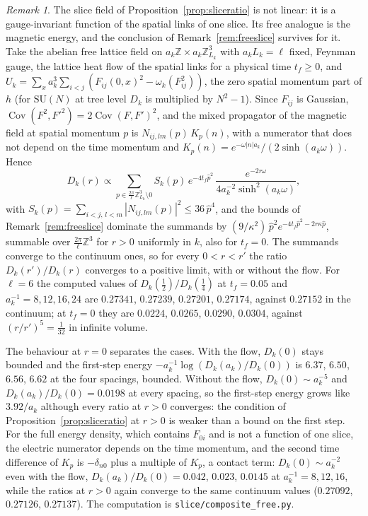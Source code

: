 \documentclass[11pt]{amsart}
\theoremstyle{definition}
\theoremstyle{remark}
\newtheorem{remark}[theorem]{Remark}
\numberwithin{equation}{section}
\newcommand{\Z}{\mathbb{Z}}
\newcommand{\SU}{\mathrm{SU}}
\begin{document}
\begin{remark}\label{rem:compositeslice}
The slice field of Proposition~\ref{prop:sliceratio} is not linear: it is a
gauge-invariant function of the spatial links of one slice. Its free analogue
is the magnetic energy, and the conclusion of Remark~\ref{rem:freeslice}
survives for it. Take the abelian free lattice field on $a_k\Z\times
a_k\Z^3_{L_k}$ with $a_kL_k=\ell$ fixed, Feynman gauge, the lattice heat flow
of the spatial links for a physical time $t_f\ge0$, and
$U_k=\sum_x a_k^3\sum_{i<j}(F_{ij}(0,x)^2-\omega_k(F_{ij}^2))$, the zero
spatial momentum part of $h$ (for $\SU(N)$ at tree level $D_k$ is multiplied by
$N^2-1$). Since $F_{ij}$ is Gaussian, $\operatorname{Cov}(F^2,F'^2)=2\operatorname{Cov}(F,F')^2$,
and the mixed propagator of the magnetic field at spatial momentum $p$ is
$N_{ij,lm}(p)\,K_p(n)$, with a numerator that does not depend on the time
momentum and $K_p(n)=e^{-\omega|n|a_k}/(2\sinh(a_k\omega))$. Hence
\[
D_k(r)\propto\sum_{p\in\frac{2\pi}\ell\Z^3_{L_k}\setminus0}
S_k(p)\,e^{-4t_f\hat p^2}\,\frac{e^{-2r\omega}}{4a_k^{-2}\sinh^2(a_k\omega)},
\]
with $S_k(p)=\sum_{i<j,\,l<m}|N_{ij,lm}(p)|^2\le36\,\hat p^4$,
and the bounds of Remark~\ref{rem:freeslice} dominate the summands by
$(9/\kappa^2)\,\hat p^2e^{-4t_f\hat p^2-2r\kappa\hat p}$, summable over
$\frac{2\pi}\ell\Z^3$ for $r>0$ uniformly in $k$, also for $t_f=0$. The summands
converge to the continuum ones, so for every $0<r<r'$ the ratio
$D_k(r')/D_k(r)$ converges to a positive limit, with or without the flow. For
$\ell=6$ the computed values of $D_k(\frac12)/D_k(\frac14)$ at $t_f=0.05$ and
$a_k^{-1}=8,12,16,24$ are $0.27341$, $0.27239$, $0.27201$, $0.27174$, against
$0.27152$ in the continuum; at $t_f=0$ they are $0.0224$, $0.0265$,
$0.0290$, $0.0304$, against $(r/r')^5=\frac1{32}$ in infinite volume.

The behaviour at $r=0$ separates the cases. With the flow, $D_k(0)$ stays
bounded and the first-step energy $-a_k^{-1}\log(D_k(a_k)/D_k(0))$ is $6.37$,
$6.50$, $6.56$, $6.62$ at the four spacings, bounded. Without the flow,
$D_k(0)\sim a_k^{-5}$ and $D_k(a_k)/D_k(0)=0.0198$ at every spacing, so the
first-step energy grows like $3.92/a_k$ although every ratio at $r>0$
converges: the condition of Proposition~\ref{prop:sliceratio} at $r>0$ is
weaker than a bound on the first step. For the full energy density, which
contains $F_{0i}$ and is not a function of one slice, the electric numerator
depends on the time momentum, and the second time difference of $K_p$ is
$-\delta_{n0}$ plus a multiple of $K_p$, a contact term: $D_k(0)\sim a_k^{-2}$ even with the flow, $D_k(a_k)/D_k(0)=0.042$,
$0.023$, $0.0145$ at $a_k^{-1}=8,12,16$, while the ratios at $r>0$ again
converge to the same continuum values ($0.27092$, $0.27126$, $0.27137$). The
computation is \texttt{slice/composite\_free.py}.


\end{remark}
\end{document}
